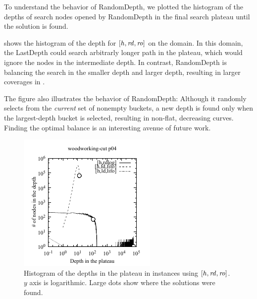 To understand the behavior of RandomDepth, we plotted the histogram of
the depths of search nodes opened by RandomDepth in the final search
plateau until the solution is found.

 shows the histogram of the depth
for $[h,\mbox{\textit{rd}},\mbox{\textit{ro}}]$ %
on the  domain.
% 
In this domain, the LastDepth could search arbitrarly longer path in the
plateau, which would ignore the nodes in the intermediate depth.
In contrast, RandomDepth is balancing the search in the smaller depth and larger
depth, resulting in larger coverages in .

The figure also illustrates the behavior of RandomDepth: Although it
randomly selects from the \emph{current} set of nonempty buckets,
a new depth is found only when the largest-depth bucket is selected,
resulting in non-flat, decreasing curves.
Finding the optimal balance is an interesting avenue of
future work.

\begin{figure}[tb]
 \centering {}
 \includegraphics{tables/aaai16-log-rd/2zerocost/depth-histogram-woodworking-cut-p04.pdf}
 \caption{Histogram of the depths in the plateau in
 instances using $[h,\mbox{\textit{rd}},\mbox{\textit{ro}}]$. $y$ axis is logarithmic.
 Large dots show where the solutions were found.
 }
 \label{depth-histogram}
\end{figure}



